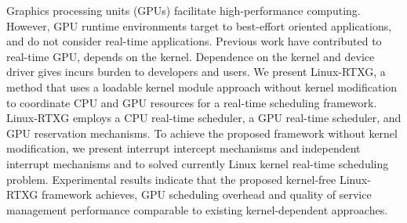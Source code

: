 Graphics processing units (GPUs) facilitate high-performance computing.
However, GPU runtime environments target to best-effort oriented applications, and do not consider real-time applications.
Previous work have contributed to real-time GPU, depends on the kernel.
Dependence on the kernel and device driver gives incurs burden to developers and users.
We present Linux-RTXG, a method that uses a loadable kernel module approach without kernel modification to coordinate CPU and GPU resources for a real-time scheduling framework.
Linux-RTXG employs a CPU real-time scheduler, a GPU real-time scheduler, and GPU reservation mechanisms.
To achieve the proposed framework without kernel modification,
we present interrupt intercept mechanisms and independent interrupt mechanisms and to solved currently Linux kernel real-time scheduling problem.
Experimental results indicate that the proposed kernel-free Linux-RTXG framework achieves, GPU scheduling overhead and quality of service management performance comparable to existing kernel-dependent approaches.
